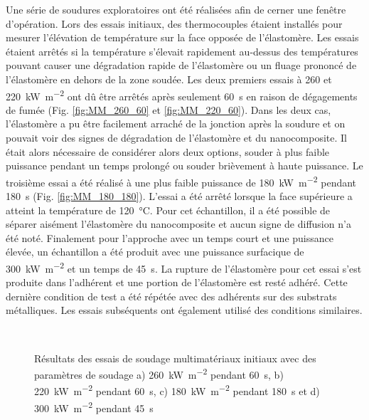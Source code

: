 Une série de soudures exploratoires ont été réalisées afin de cerner une fenêtre d'opération. 
Lors des essais initiaux, des thermocouples étaient installés pour mesurer l'élévation de température sur la face opposée de l'élastomère. 
Les essais étaient arrêtés si la température s'élevait rapidement au-dessus des températures pouvant causer une dégradation rapide de l'élastomère ou un fluage prononcé de l'élastomère en dehors de la zone soudée. 
Les deux premiers essais à 260 et \SI[locale=FR]{220}{\kilo\watt\per\square\metre} ont dû être arrêtés après seulement \SI[locale=FR]{60}{\second} en raison de dégagements de fumée (Fig. \ref{fig:MM_260_60} et \ref{fig:MM_220_60}). 
Dans les deux cas, l'élastomère a pu être facilement arraché de la jonction après la soudure et on pouvait voir des signes de dégradation de l'élastomère et du nanocomposite. 
Il était alors nécessaire de considérer alors deux options, souder à plus faible puissance pendant un temps prolongé ou souder brièvement à haute puissance. 
Le troisième essai a été réalisé à une plus faible puissance de \SI[locale=FR]{180}{\kilo\watt\per\square\metre} pendant \SI[locale=FR]{180}{\second} (Fig. \ref{fig:MM_180_180}). 
L'essai a été arrêté lorsque la face supérieure a atteint la température de \SI[locale=FR]{120}{\celsius}. 
Pour cet échantillon, il a été possible de séparer aisément l'élastomère du nanocomposite et aucun signe de diffusion n'a été noté. 
Finalement pour l'approche avec un temps court et une puissance élevée, un échantillon a été produit avec une puissance surfacique de \SI[locale=FR]{300}{\kilo\watt\per\square\metre} et un temps de \SI[locale=FR]{45}{\second}. 
La rupture de l'élastomère pour cet essai s'est produite dans l'adhérent et une portion de l'élastomère est resté adhéré. 
Cette dernière condition de test a été répétée avec des adhérents sur des substrats métalliques. 
Les essais subséquents ont également utilisé des conditions similaires. 

\FloatBarrier
\begin{figure}[h]
	\centering
	 \qquad
	 \\
	
	 \qquad
	\caption{Résultats des essais de soudage multimatériaux initiaux avec des paramètres de soudage a) \SI{260}{\kilo\watt\per\square\metre} pendant \SI{60}{\second}, b) \SI{220}{\kilo\watt\per\square\metre} pendant \SI{60}{\second}, c) \SI{180}{\kilo\watt\per\square\metre} pendant \SI{180}{\second} et d) \SI{300}{\kilo\watt\per\square\metre} pendant \SI{45}{\second}}
	\label{fig:MM_essais_initiaux}
\end{figure}
\FloatBarrier

